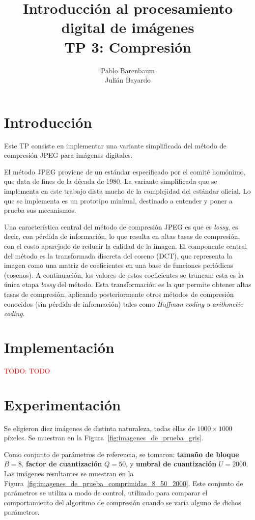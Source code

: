 \documentclass{article}
\title{
  Introducci\'on al procesamiento digital de im\'agenes \\
  {\bf TP 3: Compresi\'on}
}
\author{
  Pablo Barenbaum \\
  Juli\'an Bayardo
}
\date{}
\newcommand{\TODO}[1]{\textcolor{red}{TODO: #1}}
\begin{document}
\maketitle

\section{Introducción}

Este TP consiste en implementar una variante simplificada del método
de compresión JPEG para imágenes digitales.

El método JPEG proviene de un estándar especificado por el comité homónimo,
que data de fines de la década de 1980.
La variante simplificada que se implementa en este trabajo
dista mucho de la complejidad del estándar oficial.
Lo que se implementa es un prototipo minimal,
destinado a entender y poner a prueba sus mecanismos.

Una característica central del método de compresión JPEG es que es {\em lossy},
es decir, con pérdida de información,
lo que resulta en altas tasas de compresión,
con el costo aparejado de reducir la calidad de la imagen.
El componente central del método es la
transformada discreta del coseno (DCT), que representa la imagen
como una matriz de coeficientes en una base de funciones periódicas
(cosenos).
A continuación, los valores de estos coeficientes se truncan:
esta es la única etapa {\em lossy} del método.
Esta transformación es la que permite obtener altas tasas de compresión,
aplicando posteriormente otros métodos de compresión conocidos
(sin pérdida de información) tales como {\em Huffman coding}
o {\em arithmetic coding}.

\section{Implementación}

\TODO{TODO}

\section{Experimentación}

Se eligieron diez imágenes de distinta naturaleza, todas ellas de
$1000 \times 1000$ píxeles. Se muestran en la Figura~\ref{fig:imagenes_de_prueba_gris}.

Como conjunto de parámetros de referencia, se tomaron:
{\bf tamaño de bloque} $B = 8$,
{\bf factor de cuantización} $Q = 50$,
y {\bf umbral de cuantización} $U = 2000$.
Las imágenes resultantes se muestran en
la Figura~\ref{fig:imagenes_de_prueba_comprimidas_8_50_2000}.
Este conjunto de parámetros se utiliza a modo de control,
utilizado para comparar el comportamiento del algoritmo de compresión
cuando se varía alguno de dichos parámetros.
\end{document}
